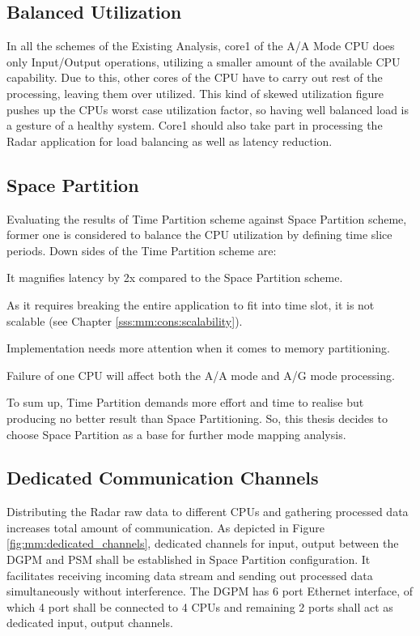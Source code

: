 \subsection{Balanced Utilization}
In all the schemes of the Existing Analysis, core1 of the A/A Mode CPU does only Input/Output operations, utilizing a smaller amount of the available CPU capability. Due to this, other cores of the CPU have to carry out rest of the processing, leaving them over utilized. This kind of skewed utilization figure pushes up the CPUs worst case utilization factor, so having well balanced load is a gesture of a healthy system. Core1 should also take part in processing the Radar application for load balancing as well as latency reduction. \vspace*{0.2cm}

\subsection{Space Partition}
Evaluating the results of Time Partition scheme against Space Partition scheme, former one is considered to balance the CPU utilization by defining time slice periods. Down sides of the Time Partition scheme are:
\begin{compactitem} 
\item It magnifies latency by 2x compared to the Space Partition scheme.
\item As it requires breaking the entire application to fit into time slot, it is not scalable (see Chapter \ref{sss:mm:cons:scalability}).
\item Implementation needs more attention when it comes to memory partitioning.
\item Failure of one CPU will affect both the A/A mode and A/G mode processing.
\end{compactitem} 
\vspace*{0.2cm}
To sum up, Time Partition demands more effort and time to realise but producing no better result than Space Partitioning. So, this thesis decides to choose Space Partition as a base for further mode mapping analysis.

\subsection{Dedicated Communication Channels}
Distributing the Radar raw data to different CPUs and gathering processed data increases total amount of communication. As depicted in Figure \ref{fig:mm:dedicated_channels}, dedicated channels for input, output between the DGPM and PSM shall be established in Space Partition configuration. It facilitates receiving incoming data stream and sending out processed data simultaneously without interference. The DGPM has 6 port Ethernet interface, of which 4 port shall be connected to 4 CPUs and remaining 2 ports shall act as dedicated input, output channels.

